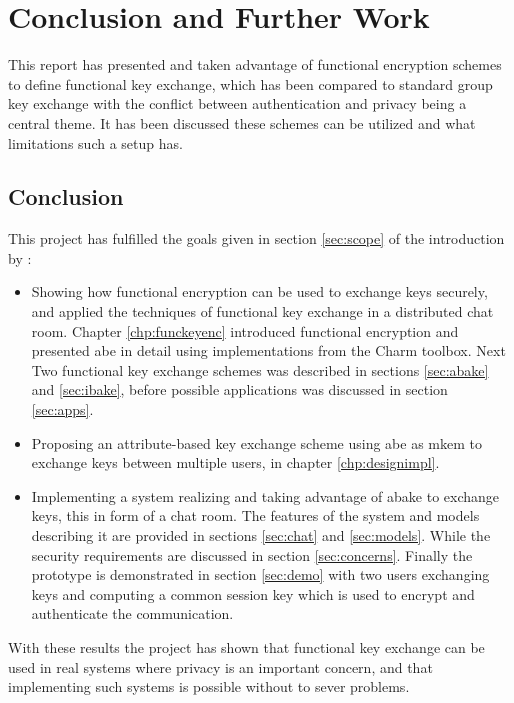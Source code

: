 \chapter{Conclusion and Further Work}\label{cha:conclusion}
This report has presented and taken advantage of functional encryption schemes to define functional key exchange, which has been compared to standard group key exchange with the conflict between authentication and privacy being a central theme. It has been discussed these schemes can be utilized and what limitations such a setup has.

\section{Conclusion}
This project has fulfilled the goals given in section \ref{sec:scope} of the introduction by :
\begin{itemize}
 \item Showing how functional encryption can be used to exchange keys securely, and applied the techniques of functional key exchange in a distributed chat room. Chapter \ref{chp:funckeyenc} introduced functional encryption and presented \gls{abe} in detail using implementations from the Charm toolbox. Next Two functional key exchange schemes was described in sections \ref{sec:abake} and \ref{sec:ibake}, before possible applications was discussed in section \ref{sec:apps}.
\item Proposing an attribute-based key exchange scheme using \gls{abe} as m\gls{kem} to exchange keys between multiple users, in chapter \ref{chp:designimpl}.
\item Implementing a system realizing and taking advantage of \gls{abake} to exchange keys, this in form of a chat room. The features of the system and models describing it are provided in sections \ref{sec:chat} and \ref{sec:models}. While the security requirements are discussed in section \ref{sec:concerns}. Finally the prototype is demonstrated in section \ref{sec:demo} with two users exchanging keys and computing a common session key which is used to encrypt and authenticate the communication.
\end{itemize}

With these results the project has shown that functional key exchange can be used in real systems where privacy is an important concern, and that implementing such systems is possible without to sever problems. 

